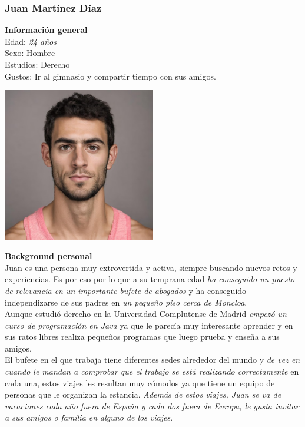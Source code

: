 \subsubsection{Juan Martínez Díaz}

\begin{minipage}{0.4\textwidth}
    \textbf{Información general} \\

    Edad: \textit{24 años} \\
    Sexo: Hombre \\
    Estudios: Derecho \\
    Gustos: Ir al gimnasio y compartir tiempo con sus amigos. \\
\end{minipage}
\hfill
\begin{minipage}{0.4\textwidth}
    \includegraphics[width=0.5\textwidth]{Imagenes/Personas/Juan.jpg}
\end{minipage}

\textbf{Background personal} \\

Juan es una persona muy extrovertida y activa, siempre buscando nuevos retos y experiencias. Es por eso por lo que a su temprana edad \textit{ha conseguido un puesto de relevancia en un importante bufete de abogados} y ha conseguido independizarse de sus padres en \textit{un pequeño piso cerca de Moncloa}. \\

Aunque estudió derecho en la Universidad Complutense de Madrid \textit{empezó un curso de programación en Java} ya que le parecía muy interesante aprender y en sus ratos libres realiza pequeños programas que luego prueba y enseña a sus amigos. \\

El bufete en el que trabaja tiene diferentes sedes alrededor del mundo y \textit{de vez en cuando le mandan a comprobar que el trabajo se está realizando correctamente} en cada una, estos viajes les resultan muy cómodos ya que tiene un equipo de personas que le organizan la estancia. \textit{Además de estos viajes, Juan se va de vacaciones cada año fuera de España y cada dos fuera de Europa, le gusta invitar a sus amigos o familia en alguno de los viajes}. \\

